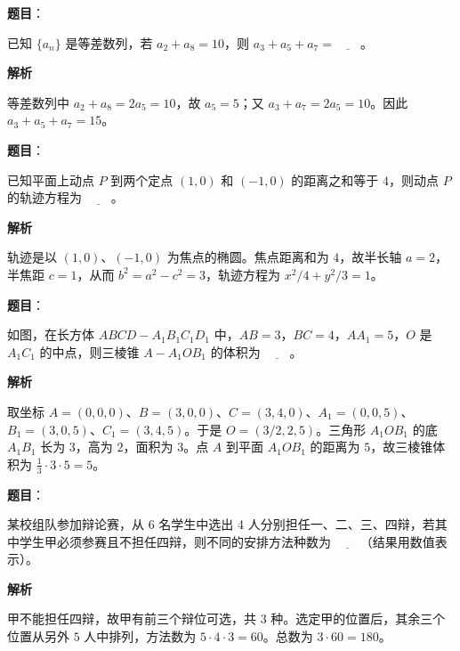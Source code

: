 \begin{answer}

\textbf{题目}：

已知 $\{a_n\}$ 是等差数列，若 $a_2+a_8=10$，则 $a_3+a_5+a_7=\underline{\qquad}$。

\textbf{解析}

等差数列中 $a_2+a_8=2a_5=10$，故 $a_5=5$；又 $a_3+a_7=2a_5=10$。因此 $a_3+a_5+a_7=15$。


\end{answer}
\begin{answer}

\textbf{题目}：

已知平面上动点 $P$ 到两个定点 $(1,0)$ 和 $(-1,0)$ 的距离之和等于 $4$，则动点 $P$ 的轨迹方程为 $\underline{\qquad}$。

\textbf{解析}

轨迹是以 $(1,0)$、$(-1,0)$ 为焦点的椭圆。焦点距离和为 $4$，故半长轴 $a=2$，半焦距 $c=1$，从而 $b^2=a^2-c^2=3$，轨迹方程为 $x^2/4+y^2/3=1$。


\end{answer}
\begin{answer}

\textbf{题目}：

如图，在长方体 $ABCD-A_1B_1C_1D_1$ 中，$AB=3$，$BC=4$，$AA_1=5$，$O$ 是 $A_1C_1$ 的中点，则三棱锥 $A-A_1OB_1$ 的体积为 $\underline{\qquad}$。
\nopagebreak[4]
\begin{center}\end{center}
\nopagebreak[4]
\textbf{解析}
\nopagebreak[4]
\begin{center}\end{center}
\nopagebreak[4]
取坐标 $A=(0,0,0)$、$B=(3,0,0)$、$C=(3,4,0)$、$A_1=(0,0,5)$、$B_1=(3,0,5)$、$C_1=(3,4,5)$。于是 $O=(3/2,2,5)$。三角形 $A_1OB_1$ 的底 $A_1B_1$ 长为 $3$，高为 $2$，面积为 $3$。点 $A$ 到平面 $A_1OB_1$ 的距离为 $5$，故三棱锥体积为 $\frac13\cdot3\cdot5=5$。


\end{answer}
\begin{answer}

\textbf{题目}：

某校组队参加辩论赛，从 6 名学生中选出 4 人分别担任一、二、三、四辩，若其中学生甲必须参赛且不担任四辩，则不同的安排方法种数为 $\underline{\qquad}$（结果用数值表示）。

\textbf{解析}

甲不能担任四辩，故甲有前三个辩位可选，共 $3$ 种。选定甲的位置后，其余三个位置从另外 $5$ 人中排列，方法数为 $5\cdot4\cdot3=60$。总数为 $3\cdot60=180$。


\end{answer}
